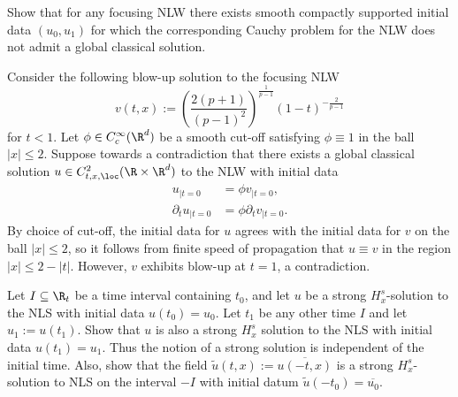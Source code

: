 \begin{statement}
	Show that for any focusing NLW there exists smooth compactly supported initial data $(u_0, u_1)$ for which the corresponding Cauchy problem for the NLW does not admit a global classical solution. 
\end{statement}

\begin{solution}
	Consider the following blow-up solution to the focusing NLW
		\[ v (t, x) := \left(  \frac{2(p + 1)}{(p - 1)^2}\right)^{\frac{1}{p - 1}} (1 - t)^{-\frac{2}{p - 1}} \]
	for $t < 1$. Let $\phi \in C^\infty_c (\R^d)$ be a smooth cut-off satisfying $\phi \equiv 1$ in the ball $|x| \leq 2$. Suppose towards a contradiction that there exists a global classical solution $u \in C^2_{t, x, \loc} (\R \times \R^d)$ to the NLW with initial data 
		\begin{align*}
			u_{|t = 0}		&= \phi v_{|t = 0}, \\
			\partial_t u_{|t = 0} &= \phi  \partial_t v_{|t = 0}.
		\end{align*}
	By choice of cut-off, the initial data for $u$ agrees with the initial data for $v$ on the ball $|x| \leq 2$, so it follows from finite speed of propagation that $u \equiv v$ in the region $|x| \leq 2 - |t|$. However, $v$ exhibits blow-up at $t = 1$, a contradiction. 
\end{solution}

\begin{statement}
	Let $I \subseteq \R_t$ be a time interval containing $t_0$, and let $u$ be a strong $H^s_x$-solution to the NLS with initial data $u(t_0) = u_0$. Let $t_1$ be any other time $I$ and let $u_1:= u(t_1)$. Show that $u$ is also a strong $H^s_x$ solution to the NLS with initial data $u(t_1) = u_1$. Thus the notion of a strong solution is independent of the initial time. Also, show that the field $\widetilde u (t, x) := \overline{u (-t, x)}$ is a strong $H^s_x$-solution to NLS on the interval $-I$ with initial datum $\widetilde{u}(-t_0) = \overline{u_0}$. 
\end{statement}

